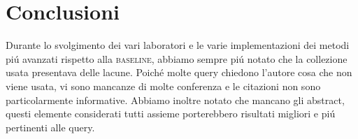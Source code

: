 \documentclass{llncs}
\begin{document}


\section{Conclusioni}
\label{sec:conclusioni}

Durante lo svolgimento dei vari laboratori e le varie implementazioni dei metodi pi\'u avanzati rispetto alla \textsc{baseline}, abbiamo sempre pi\'u notato che la collezione usata presentava delle lacune. Poich\'e molte query chiedono l'autore cosa che non viene usata, vi sono mancanze di molte conferenza e le citazioni non sono particolarmente informative. Abbiamo inoltre notato che mancano gli abstract, questi elemente considerati tutti assieme porterebbero risultati migliori e pi\'u pertinenti alle query.




\end{document}

